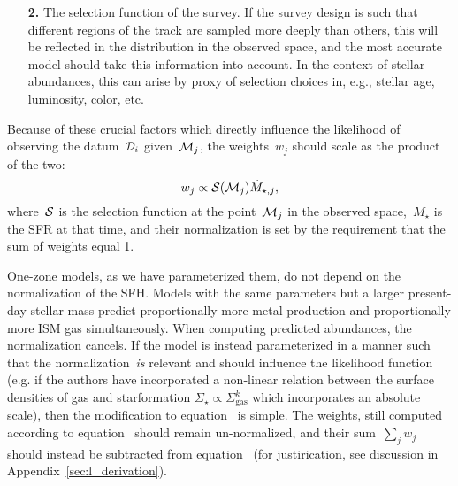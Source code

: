 \documentclass[ms.tex]{subfiles}
\begin{document}
\begin{itemize}
\begin{itemize}
\begin{itemize}
			\item[\textbf{2.}] The selection function of the survey.
			If the survey design is such that different regions of the track
			are sampled more deeply than others, this will be reflected in the
			distribution in the observed space, and the most accurate model
			should take this information into account.
			In the context of stellar abundances, this can arise by proxy of
			selection choices in, e.g., stellar age, luminosity, color, etc.
		\end{itemize}
		Because of these crucial factors which directly influence the
		likelihood of observing the datum~$\mathcal{D}_i$ given~$\mathcal{M}_j$,
		the weights~$w_j$ should scale as the product of the two:
		\begin{equation}
		w_j \propto \mathcal{S}(\mathcal{M}_j) \dot{M}_{\star,j},
		\label{eq:weights}
		\end{equation}
		where~$\mathcal{S}$ is the selection function at the point~$\mathcal{M}_j$
		in the observed space,~$\dot{M}_\star$ is the SFR at that time, and
		their normalization is set by the requirement that the sum of weights
		equal 1.
		\par
		One-zone models, as we have parameterized them, do not depend on the
		normalization of the SFH.
		Models with the same parameters but a larger present-day stellar mass
		predict proportionally more metal production and proportionally
		more ISM gas simultaneously.
		When computing predicted abundances, the normalization cancels.
		If the model is instead parameterized in a manner such that the
		normalization~\textit{is} relevant and should influence the likelihood
		function (e.g. if the authors have incorporated a non-linear relation
		between the surface densities of gas and starformation
		$\dot{\Sigma}_\star \propto \Sigma_\text{gas}^k$ which incorporates an
		absolute scale), then the modification to equation~
		is simple.
		The weights, still computed according to equation~
		should remain un-normalized, and their sum~$\sum_j w_j$ should instead
		be subtracted from equation~ (for justirication,
		see discussion in Appendix~\ref{sec:l_derivation}).
	\end{itemize}




\end{itemize}
\end{document}
